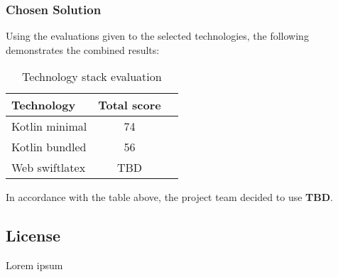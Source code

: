 \subsubsection{Chosen Solution}
Using the evaluations given to the selected technologies, the following demonstrates the combined results:
\begin{table}[H]
    \centering
    \begin{tabular}{|l|c|c|}
        \hline
        \textbf{Technology} & \textbf{Total score} \\
        \hline
        Kotlin minimal & 74 \\
        \hline
        Kotlin bundled & 56 \\
        \hline
        Web swiftlatex & TBD \\
        \hline
    \end{tabular}
    \caption{Technology stack evaluation}
    \label{table:technology_evaluation}
\end{table}
In accordance with the table above, the project team decided to use \textbf{TBD}.

\subsection{License}
Lorem ipsum